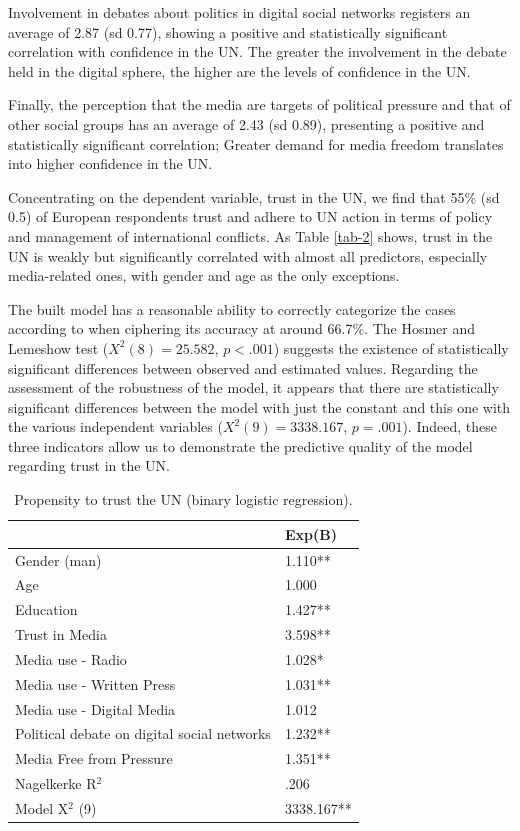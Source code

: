 \documentclass[english]{textolivre}
\begin{document}
Involvement in debates about politics in digital social networks registers an average of 2.87 (sd 0.77), showing a positive and statistically significant correlation with confidence
in the UN. The greater the involvement in the debate held in the digital sphere, the higher are the levels of confidence in the UN.

Finally, the perception that the media are targets of political pressure and that of other social groups has an average of 2.43 (sd 0.89), presenting a positive and statistically significant correlation; Greater demand for media freedom translates into higher confidence in the UN.

Concentrating on the dependent variable, trust in the UN, we find that 55\% (sd 0.5) of European respondents trust and adhere to UN action in terms of policy and management of international conflicts. As Table \ref{tab-2} shows, trust in the UN is weakly but significantly correlated with almost all predictors, especially media-related ones, with gender and age as the only exceptions.

The built model has a reasonable ability to correctly categorize the cases according to \textcite{maroco2010} when ciphering its accuracy at around 66.7\%. The Hosmer and Lemeshow test ($X^2(8) = 25.582$, $p<.001$) suggests the existence of statistically significant differences between observed and estimated values. Regarding the assessment of the robustness of the model, it appears that there are statistically significant differences between the model with just the constant and this one with the various independent variables ($X^2(9) = 3338.167$, $p=.001$). Indeed, these three indicators allow us to demonstrate the predictive quality of the model regarding trust in the UN.

\begin{table}[h!]
\centering
\begin{threeparttable}
\caption{Propensity to trust the UN (binary logistic regression).}\label{tab-3}
\begin{tabular}{p{8cm} p{2.5cm}}
\toprule
 & Exp(B) \\
\midrule
Gender (man) & 1.110** \\
Age & 1.000 \\
Education & 1.427** \\
Trust in Media & 3.598** \\
Media use - Radio & 1.028* \\
Media use - Written Press & 1.031** \\
Media use - Digital Media & 1.012 \\
Political debate on digital social networks & 1.232** \\
Media Free from Pressure & 1.351** \\
Nagelkerke R$^2$ & .206 \\
Model Χ$^2$ (9) & 3338.167** \\
\bottomrule
\end{tabular}
\end{threeparttable}
\end{table}
\end{document}
